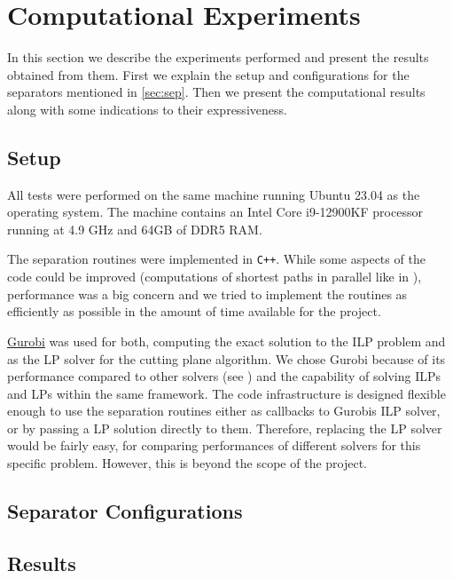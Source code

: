 \section{Computational Experiments}\label{sec:comp}
In this section we describe the experiments performed and present the results obtained from them.
First we explain the setup and configurations for the separators mentioned in \cref{sec:sep}.
Then we present the computational results along with some indications to their expressiveness.

\subsection{Setup}\label{subsec:comp_setup}
All tests were performed on the same machine running Ubuntu 23.04 as the operating system.
The machine contains an Intel Core i9-12900KF processor running at 4.9 GHz and 64GB of DDR5 RAM. 

The separation routines were implemented in \texttt{C++}.
While some aspects of the code could be improved (\eg computations of shortest paths in parallel like in \cite{sorensenSeparationHeuristic2Partition2020}),
performance was a big concern and we tried to implement the routines as efficiently as possible in the amount of time available for the project.

\href{https://www.gurobi.com}{Gurobi} was used for both, computing the exact solution to the ILP problem and as the LP solver for the cutting plane algorithm.
We chose Gurobi because of its performance compared to other solvers (see \cite{meindlAnalysisCommercialFree2012}) and the capability of solving ILPs and LPs within the same framework.
The code infrastructure is designed flexible enough to use the separation routines either as callbacks to Gurobis ILP solver, or by passing a LP solution directly to them.
Therefore, replacing the LP solver would be fairly easy, \eg for comparing performances of different solvers for this specific problem.
However, this is beyond the scope of the project.

\subsection{Separator Configurations}\label{subsec:run_configs}

\subsection{Results}\label{subsec:comp_results}
